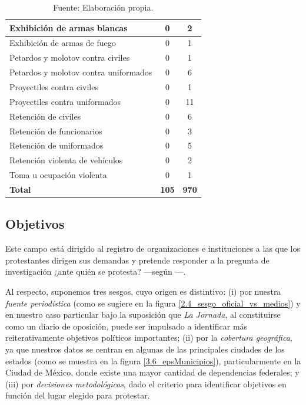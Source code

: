 \documentclass[letterpaper, 11pt]{book}
\theoremstyle{definition}
\theoremstyle{remark}
\begin{document}
\begin{table}[H]
\begin{tabular}{ | l | c | c | }
Exhibición de armas blancas & 0 & 2\\
\hline
Exhibición de armas de fuego & 0 & 1\\
\hline
Petardos y molotov contra civiles & 0 & 1\\
\hline
Petardos y molotov contra uniformados & 0 & 6\\
\hline
Proyectiles contra civiles & 0 & 1\\
\hline
Proyectiles contra uniformados & 0 & 11\\
\hline
Retención de civiles & 0 & 6\\
\hline
Retención de funcionarios & 0 & 3\\
\hline
Retención de uniformados & 0 & 5\\
\hline
Retención violenta de vehículos & 0 & 2\\
\hline
Toma u ocupación violenta & 0 & 1\\
\hline
\textbf{Total} & \textbf{105} & \textbf{970} \\
\hline
\end{tabular}
\par\bigskip
\caption*{\small Fuente: Elaboración propia.}
\end{table}





\subsection{Objetivos}
\label{sec:Opositores}


Este campo está dirigido al registro de organizaciones e instituciones a las que los protestantes dirigen sus demandas  y pretende responder a la pregunta de investigación ¿ante quién se protesta? ---según \citet{2017_Cadena_ManualLAOMS}---. 


Al respecto, suponemos tres sesgos, cuyo origen es distintivo: 
(i) por nuestra \emph{fuente periodística} (como se sugiere en  la figura \ref{2.4_sesgo_oficial_vs_medios}) y en nuestro caso particular bajo la suposición que \emph{La Jornada}, al constituirse como un diario de oposición, puede ser impulsado a identificar más reiterativamente objetivos políticos importantes;  
(ii) por la \emph{cobertura geográfica}, ya que nuestros datos se centran en algunas de las principales ciudades de los estados (como se muestra en la figura \ref{3.6_epsMunicipios}), particularmente en la Ciudad de México, donde existe una mayor cantidad de dependencias federales; 
y (iii) por \emph{decisiones metodológicas}, dado el criterio para identificar objetivos en función del lugar elegido para protestar. 
\end{document}
